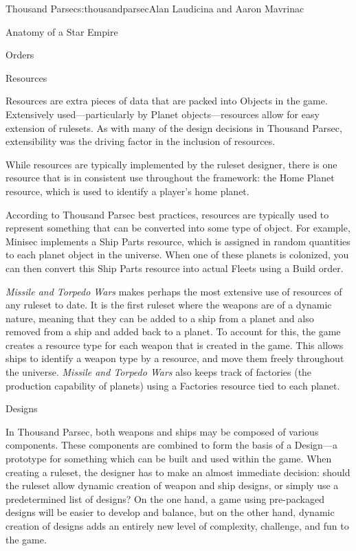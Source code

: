 \begin{aosachapter}{Thousand Parsec}{s:thousandparsec}{Alan Laudicina and Aaron Mavrinac}
\begin{aosasect1}{Anatomy of a Star Empire}
\begin{aosasect2}{Orders}
\end{aosasect2}

\begin{aosasect2}{Resources}

Resources are extra pieces of data that are packed into Objects in the
game. Extensively used---particularly by Planet objects---resources
allow for easy extension of rulesets. As with many of the design
decisions in Thousand Parsec, extensibility was the driving factor in
the inclusion of resources.

While resources are typically implemented by the ruleset designer,
there is one resource that is in consistent use throughout the
framework: the Home Planet resource, which is used to identify a
player's home planet.

According to Thousand Parsec best practices, resources are typically
used to represent something that can be converted into some type of
object. For example, Minisec implements a Ship Parts resource, which
is assigned in random quantities to each planet object in the
universe.  When one of these planets is colonized, you can then
convert this Ship Parts resource into actual Fleets using a Build
order.

\emph{Missile and Torpedo Wars} makes perhaps the most extensive use
of resources of any ruleset to date. It is the first ruleset where the
weapons are of a dynamic nature, meaning that they can be added to a
ship from a planet and also removed from a ship and added back to a
planet. To account for this, the game creates a resource type for each
weapon that is created in the game. This allows ships to identify a
weapon type by a resource, and move them freely throughout the
universe. \emph{Missile and Torpedo Wars} also keeps track of
factories (the production capability of planets) using a Factories
resource tied to each planet.

\end{aosasect2}

\begin{aosasect2}{Designs}

In Thousand Parsec, both weapons and ships may be composed of various
components. These components are combined to form the basis of a
Design---a prototype for something which can be built and used within
the game. When creating a ruleset, the designer has to make an almost
immediate decision: should the ruleset allow dynamic creation of
weapon and ship designs, or simply use a predetermined list of
designs? On the one hand, a game using pre-packaged designs will be
easier to develop and balance, but on the other hand, dynamic creation
of designs adds an entirely new level of complexity, challenge, and
fun to the game.


\end{aosasect2}
\end{aosasect1}
\end{aosachapter}
